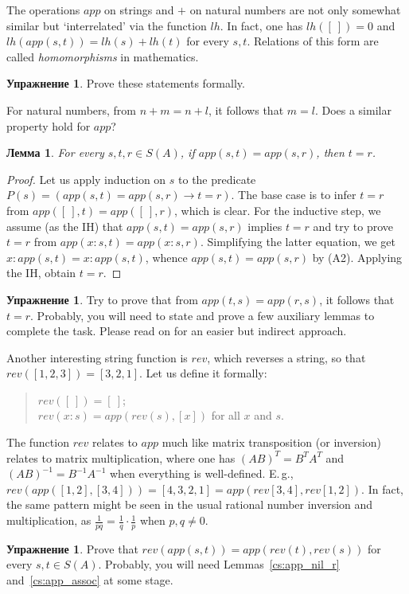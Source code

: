 \documentclass[12pt,notitlepage]{article}
\theoremstyle{plain}
\newtheorem{lemma}[thm]{Лемма}
\theoremstyle{definition}
\newtheorem{exc}[thm]{Упражнение}
\theoremstyle{plain}
\newcommand{\1}{\mathbf{1}}
\newcommand{\0}{\mathbf{0}}
\begin{document}
The operations $app$ on strings and $+$ on natural numbers are not only somewhat similar but `interrelated' via the function $lh$. In fact, one has $lh([\ ]) = 0$ and $lh(app(s, t)) = lh(s) + lh(t)$ for every $s, t$. Relations of this form are called \emph{homomorphisms} in mathematics.
\begin{exc}
	Prove these statements formally.
\end{exc}

For natural numbers, from $n + m = n + l$, it follows that $m = l$. Does a similar property hold for $app$?
\begin{lemma}\label{cs:app_inv_head}
	For every $s, t, r \in S(A)$, if $app(s,t) = app(s,r)$, then $t = r$.
\end{lemma}
\begin{proof}
	Let us apply induction on $s$ to the predicate $P(s) = (app(s,t) = app(s,r) \to t = r)$. The base case is to infer $t = r$ from $app([\ ], t) = app([\ ], r)$, which is clear. For the inductive step, we assume (as the IH) that $app(s,t) = app(s,r)$ implies $t = r$ and try to prove $t = r$ from $app(x:s, t) = app(x:s, r)$. Simplifying the latter equation, we get $x : app(s,t) = x : app(s,t)$, whence $app(s,t) = app(s,r)$ by (A2). Applying the IH, obtain $t = r$.
\end{proof}
\begin{exc}
	Try to prove that from $app(t,s) = app(r,s)$, it follows that $t = r$. Probably, you will need to state and prove a few auxiliary lemmas to complete the task. Please read on for an easier but indirect approach.
\end{exc}

Another interesting string function is $rev$, which reverses a string, so that $rev([1,2,3]) = [3,2,1]$. Let us define it formally:
\begin{quote}
	$rev([\ ]) = [\ ]$;\\
	$rev(x : s) = app(rev(s), [x])$ for all $x$ and $s$.
\end{quote}
The function $rev$ relates to $app$ much like matrix transposition (or inversion) relates to matrix multiplication, where one has $(AB)^T = B^T A^T$ and $(AB)^{-1} = B^{-1} A^{-1}$ when everything is well-defined. E.\,g., $rev(app([1,2], [3,4])) = [4,3,2,1] = app(rev[3,4], rev[1,2])$. In fact, the same pattern might be seen in the usual rational number inversion and multiplication, as $\frac{1}{pq} = \frac{1}{q} \cdot \frac{1}{p}$ when $p, q \neq 0$. 

\begin{exc}\label{cs:rev_app_distr}
	Prove that $rev(app(s,t)) = app(rev(t), rev(s))$ for every $s, t \in S(A)$. Probably, you will need Lemmas~\ref{cs:app_nil_r} and~\ref{cs:app_assoc} at some stage.
\end{exc}
\end{document}
